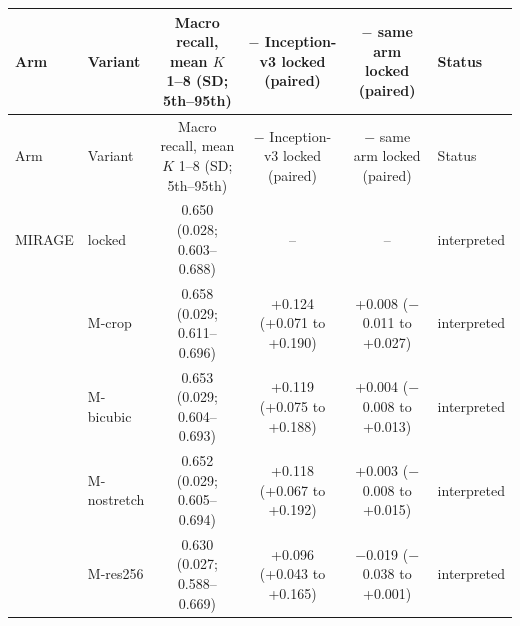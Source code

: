 \begin{longtable}{@{}llcccp{3.6cm}@{}}
\toprule
Arm & Variant & \makecell{Macro recall, mean $K$ 1--8\\(SD; 5th--95th)} & \makecell{$-$ Inception-v3 locked\\(paired)} & \makecell{$-$ same arm locked\\(paired)} & Status \\
\midrule
\endfirsthead
\toprule
Arm & Variant & \makecell{Macro recall, mean $K$ 1--8\\(SD; 5th--95th)} & \makecell{$-$ Inception-v3 locked\\(paired)} & \makecell{$-$ same arm locked\\(paired)} & Status \\
\midrule
\endhead
\bottomrule
\endfoot
\bottomrule
\endlastfoot
MIRAGE & locked & \makecell{0.650\\{\scriptsize (0.028; 0.603--0.688)}} & -- & -- & interpreted \\
 & M-crop & \makecell{0.658\\{\scriptsize (0.029; 0.611--0.696)}} & \makecell{+0.124\\{\scriptsize (+0.071 to +0.190)}} & \makecell{+0.008\\{\scriptsize ($-$0.011 to +0.027)}} & interpreted \\
 & M-bicubic & \makecell{0.653\\{\scriptsize (0.029; 0.604--0.693)}} & \makecell{+0.119\\{\scriptsize (+0.075 to +0.188)}} & \makecell{+0.004\\{\scriptsize ($-$0.008 to +0.013)}} & interpreted \\
 & M-nostretch & \makecell{0.652\\{\scriptsize (0.029; 0.605--0.694)}} & \makecell{+0.118\\{\scriptsize (+0.067 to +0.192)}} & \makecell{+0.003\\{\scriptsize ($-$0.008 to +0.015)}} & interpreted \\
 & M-res256 & \makecell{0.630\\{\scriptsize (0.027; 0.588--0.669)}} & \makecell{+0.096\\{\scriptsize (+0.043 to +0.165)}} & \makecell{$-$0.019\\{\scriptsize ($-$0.038 to +0.001)}} & interpreted \\

\end{longtable}
